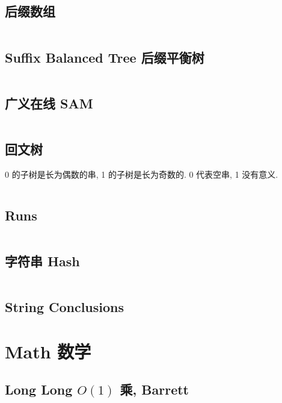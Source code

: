 \documentclass[titlepage, a4paper, 11pt]{article}
\begin{document}
\begin{spacing}{1.15}
				\subsection{后缀数组}
					\inputminted{cpp}{src/String/SA.cpp}
				\subsection{Suffix Balanced Tree 后缀平衡树}
					\inputminted{cpp}{src/String/后缀平衡树.cpp}
				\subsection{广义在线 SAM}
				\inputminted{cpp}{src/String/generalizedSAM.cpp}
				\subsection{回文树}
					0 的子树是长为偶数的串, 1 的子树是长为奇数的. 0 代表空串, 1 没有意义.
					\inputminted{cpp}{src/String/PAM.cpp}
				\subsection{Runs}
					\inputminted{cpp}{src/String/Runs.cpp}
				\subsection{字符串 Hash}
				\inputminted{cpp}{src/String/hash.cpp}	
				\subsection{String Conclusions}
					
			\newpage
			\section{Math 数学}
				\subsection{Long Long $O(1)$ 乘, Barrett}
					\inputminted{cpp}{src/Miscellany/LLFPM.cpp}

\end{spacing}
\end{document}
